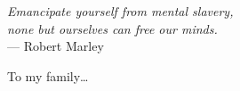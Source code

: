 \cleardoublepage
\thispagestyle{empty}

\vspace*{3cm}

\begin{raggedleft}
		\emph{Emancipate yourself from mental slavery,\\
		none but ourselves can free our minds.}\\
     --- Robert Marley\\
\end{raggedleft}

\vspace{4cm}

\begin{center}
    To my family\dots
\end{center}


